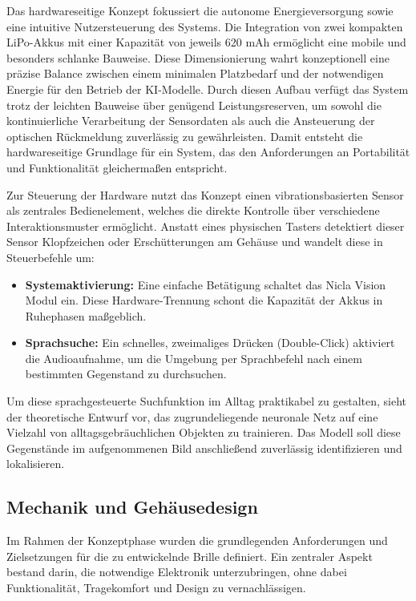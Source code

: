 Das hardwareseitige Konzept fokussiert die autonome Energieversorgung sowie eine intuitive Nutzersteuerung des Systems. Die Integration von zwei kompakten LiPo-Akkus mit einer Kapazität von jeweils 620 mAh ermöglicht eine mobile und besonders schlanke Bauweise. Diese Dimensionierung wahrt konzeptionell eine präzise Balance zwischen einem minimalen Platzbedarf und der notwendigen Energie für den Betrieb der KI-Modelle. Durch diesen Aufbau verfügt das System trotz der leichten Bauweise über genügend Leistungsreserven, um sowohl die kontinuierliche Verarbeitung der Sensordaten als auch die Ansteuerung der optischen Rückmeldung zuverlässig zu gewährleisten. Damit entsteht die hardwareseitige Grundlage für ein System, das den Anforderungen an Portabilität und Funktionalität gleichermaßen entspricht.

Zur Steuerung der Hardware nutzt das Konzept einen vibrationsbasierten Sensor als zentrales Bedienelement, welches die direkte Kontrolle über verschiedene Interaktionsmuster ermöglicht. Anstatt eines physischen Tasters detektiert dieser Sensor Klopfzeichen oder Erschütterungen am Gehäuse und wandelt diese in Steuerbefehle um:
\begin{itemize}
    \item \textbf{Systemaktivierung:} Eine einfache Betätigung schaltet das Nicla Vision Modul ein. Diese Hardware-Trennung schont die Kapazität der Akkus in Ruhephasen maßgeblich.
    \item \textbf{Sprachsuche:} Ein schnelles, zweimaliges Drücken (Double-Click) aktiviert die Audioaufnahme, um die Umgebung per Sprachbefehl nach einem bestimmten Gegenstand zu durchsuchen.
\end{itemize}

Um diese sprachgesteuerte Suchfunktion im Alltag praktikabel zu gestalten, sieht der theoretische Entwurf vor, das zugrundeliegende neuronale Netz auf eine Vielzahl von alltagsgebräuchlichen Objekten zu trainieren. Das Modell soll diese Gegenstände im aufgenommenen Bild anschließend zuverlässig identifizieren und lokalisieren.

\subsection{Mechanik und Gehäusedesign}
Im Rahmen der Konzeptphase wurden die grundlegenden Anforderungen und Zielsetzungen für die zu entwickelnde Brille definiert. Ein zentraler Aspekt bestand darin, die notwendige Elektronik unterzubringen, ohne dabei Funktionalität, Tragekomfort und Design zu vernachlässigen.

